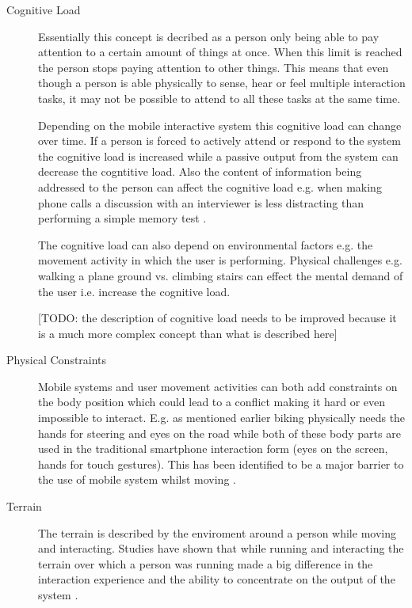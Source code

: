 \begin{description}
\item[Cognitive Load]
Essentially this concept is decribed as a person only being able to pay attention to a certain amount of things at once. When this limit is reached the person stops paying attention to other things. This means that even though a person is able physically to sense, hear or feel multiple interaction tasks, it may not be possible to attend to all these tasks at the same time.

Depending on the mobile interactive system this cognitive load can change over time. If a person is forced to actively attend or respond to the system the cognitive load is increased while a passive output from the system can decrease the cogntitive load. Also the content of information being addressed to the person can affect the cognitive load e.g. when making phone calls a discussion with an interviewer is less distracting than performing a simple memory test \cite{nunes_cognitive_2002}.

The cognitive load can also depend on environmental factors e.g. the movement activity in which the user is performing. Physical challenges e.g. walking a plane ground vs. climbing stairs can effect the mental demand of the user i.e. increase the cognitive load.

[TODO: the description of cognitive load needs to be improved because it is a much more complex concept than what is described here]

\item[Physical Constraints]
Mobile systems and user movement activities can both add constraints on the body position which could lead to a conflict making it hard or even impossible to interact. E.g. as mentioned earlier biking physically needs the hands for steering and eyes on the road while both of these body parts are used in the traditional smartphone interaction form (eyes on the screen, hands for touch gestures). This has been identified to be a major barrier to the use of mobile system whilst moving \cite{pielot_pocketmenu:_2012}.

\item[Terrain]
The terrain is described by the enviroment around a person while moving and interacting. Studies have shown that while running and interacting the terrain over which a person was running made a big difference in the interaction experience and the ability to concentrate on the output of the system \cite{marshall_using_2011}.


\end{description}
